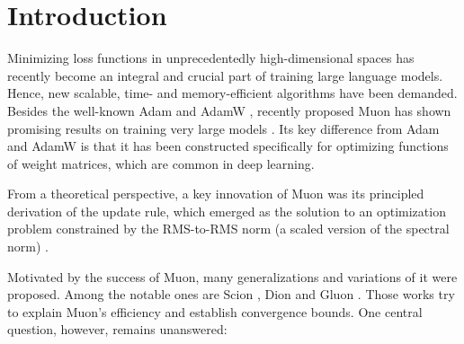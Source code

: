 \documentclass[smallextended,referee,envcountsect]{svjour3}
\begin{document}
\begin{abstract}
   In this article, we explore the use of various matrix norms for optimizing functions of weight matrices, a crucial problem in deep learning. Moving beyond the spectral norm that underlies the Muon update, we leverage the duals of the Ky Fan norms to introduce the \emph{Fanion} family of linear minimization oracle (LMO) algorithms, which are closely related to Muon, $\nu$-SAM, and Dion. Staying inside the LMO, we construct the families of \emph{F-Fanions} and \emph{S-Fanions}, whose updates are convex combinations of the updates of Fanions and Normalized SGD or SignSGD, respectively. The most promising algorithms in these families are \emph{F-Muon} and \emph{S-Muon}. By conducting an extensive empirical study of all three algorithm families across a wide range of tasks and settings, we demonstrate that F-Muon and S-Muon consistently match Muon's performance, while outperforming Muon on a synthetic smooth convex problem.
 \end{abstract}


 
 \section{Introduction}
 
 Minimizing loss functions in unprecedentedly high-dimensional spaces has recently become an integral and crucial part of training large language models. Hence, new scalable, time- and memory-efficient algorithms have been demanded. Besides the well-known Adam \citep{kingma2014adam} and AdamW \citep{loshchilov2017decoupled}, recently proposed Muon \citep{jordan2024muon} has shown promising results on training very large models \citep{liu2025muonscalablellmtraining}. Its key difference from Adam and AdamW is that it has been constructed specifically for optimizing functions of weight matrices, which are common in deep learning.
 
 From a theoretical perspective, a key innovation of Muon was its principled derivation of the update rule, which emerged as the solution to an optimization problem constrained by the RMS-to-RMS norm (a scaled version of the spectral norm) \citep{bernstein2025deriving}.
 
 Motivated by the success of Muon, many generalizations and variations of it were proposed. Among the notable ones are Scion \citep{pethick2025training}, Dion \citep{ahn2025dion} and Gluon \citep{riabinin2025gluon}. Those works try to explain Muon's efficiency and establish convergence bounds. One central question, however, remains unanswered:
 
\end{document}
